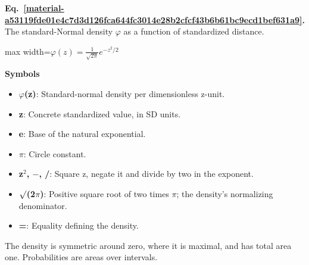 \documentclass[11pt,a4paper]{article}
\begin{document}
\par\medskip
\begin{samepage}
\label{material-a53119fde01e4c7d3d126fca644fc3014e28b2cfcf43b6b61bc9ecd1bef631a9}
\noindent\textbf{Eq.~\ref*{material-a53119fde01e4c7d3d126fca644fc3014e28b2cfcf43b6b61bc9ecd1bef631a9}.} The standard-Normal density \(\varphi\) as a function of standardized distance.\par\nopagebreak
\begin{center}\begin{adjustbox}{max width=\linewidth}$\displaystyle \varphi(z)=\frac{1}{\sqrt{2\pi}}e^{-z^2/2}$\end{adjustbox}\end{center}

\par\noindent\textbf{Symbols}

\begin{itemize}\setlength{\itemsep}{1pt}\setlength{\parsep}{0pt}
\item \textbf{\ensuremath{\varphi}(z)}: Standard-normal density per dimensionless z-unit.
\item \textbf{z}: Concrete standardized value, in SD units.
\item \textbf{e}: Base of the natural exponential.
\item \textbf{\ensuremath{\pi}}: Circle constant.
\item \textbf{z\ensuremath{{}^2}, \ensuremath{-}, /}: Square z, negate it and divide by two in the exponent.
\item \textbf{\ensuremath{\sqrt{\vphantom{x}}}(2\ensuremath{\pi})}: Positive square root of two times \ensuremath{\pi}; the density's normalizing denominator.
\item \textbf{=}: Equality defining the density.
\end{itemize}

The density is symmetric around zero, where it is maximal, and has total area one. Probabilities are areas over intervals.

\end{samepage}
\medskip
\end{document}
